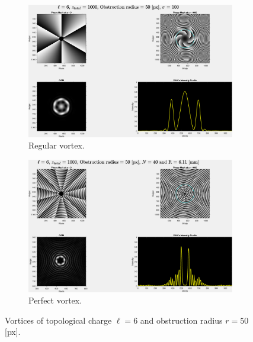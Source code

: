 \begin{figure}[htbp]
    \centering
    \begin{subfigure}[b]{0.45\textwidth}
        \centering
        \includegraphics[width=\textwidth]{images/Appendices/Additional_Results/Topological_Charge/type=0_r=50_zi=0_zf=1000.eps}
        \caption{Regular vortex.}
    \end{subfigure}
    \hfill
    \begin{subfigure}[b]{0.45\textwidth}
        \centering
        \includegraphics[width=\textwidth]{images/Appendices/Additional_Results/Topological_Charge/type=1_r=50_zi=0_zf=1000.eps}
        \caption{Perfect vortex.}
    \end{subfigure}
    \caption{Vortices of topological charge $\ell = 6$ and obstruction radius $r = 50$ [px].}
    \label{fig:L=6_r=50}
\end{figure}

